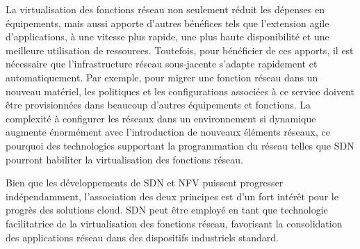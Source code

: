 


La virtualisation des fonctions réseau non seulement réduit les dépenses en équipements, mais aussi apporte d'autres bénéfices tels que l'extension agile d'applications, à une vitesse plus rapide, une plus haute disponibilité et une meilleure utilisation de ressources. Toutefois, pour bénéficier de ces apports, il est nécessaire que l'infrastructure réseau sous-jacente s'adapte rapidement et automatiquement. Par exemple, pour migrer une fonction réseau  dans un nouveau matériel, les politiques et les configurations associées à ce service doivent être provisionnées dans beaucoup d'autres équipements et fonctions. La complexité à configurer les réseaux dans un environnement si dynamique augmente énormément avec l'introduction de nouveaux éléments réseaux, ce pourquoi des technologies supportant la programmation du réseau telles que SDN pourront habiliter la virtualisation des fonctions réseau.


Bien que les développements de SDN et NFV puissent progresser indépendamment, l'association des deux principes est d'un fort intérêt pour le progrès des solutions cloud. SDN peut être employé en tant que technologie facilitatrice de la virtualisation des fonctions réseau, favorisant la consolidation des applications réseau dans des dispositifs industriels standard. \cite{OFSDNNFVintro} \cite{realTimeCloudNFV} \cite{IntelCloudEPC}

